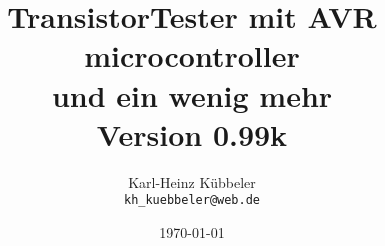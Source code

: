 \documentclass[12pt,a4paper,oneside,english]{report}
\begin{document}
\title{TransistorTester mit AVR microcontroller \\
und ein wenig mehr\\
Version 0.99k \\
}
\author{Karl-Heinz K\"ubbeler\\
\texttt{kh\_kuebbeler@web.de}}
\date{\today}
\maketitle
\tableofcontents











 
 
 
 




\end{document}
